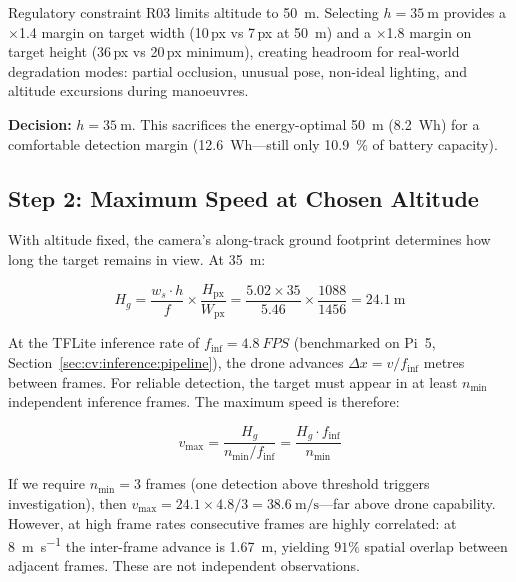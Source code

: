 Regulatory constraint R03 limits altitude to \SI{50}{\metre}.
Selecting $h = \SI{35}{\metre}$ provides a $\times$1.4 margin on target width (10\,px vs 7\,px at \SI{50}{\metre}) and a $\times$1.8 margin on target height (36\,px vs 20\,px minimum), creating headroom for real-world degradation modes: partial occlusion, unusual pose, non-ideal lighting, and altitude excursions during manoeuvres.

\textbf{Decision:} $h = \SI{35}{\metre}$.
This sacrifices the energy-optimal \SI{50}{\metre} (\SI{8.2}{Wh}) for a comfortable detection margin (\SI{12.6}{Wh}---still only \SI{10.9}{\percent} of battery capacity).

\subsection{Step 2: Maximum Speed at Chosen Altitude}\label{sec:step-max-speed}

With altitude fixed, the camera's along-track ground footprint determines how long the target remains in view.
At \SI{35}{\metre}:

\begin{equation}\label{eq:footprint-along}
  H_g = \frac{w_s \cdot h}{f} \times \frac{H_{\mathrm{px}}}{W_{\mathrm{px}}} = \frac{5.02 \times 35}{5.46} \times \frac{1088}{1456} = \SI{24.1}{\metre}
\end{equation}

At the TFLite inference rate of $f_{\mathrm{inf}} = \SI{4.8}{FPS}$ (benchmarked on Pi~5, Section~\ref{sec:cv:inference:pipeline}), the drone advances $\Delta x = v / f_{\mathrm{inf}}$ metres between frames.
For reliable detection, the target must appear in at least $n_{\min}$ independent inference frames.
The maximum speed is therefore:

\begin{equation}\label{eq:max-speed}
  v_{\max} = \frac{H_g}{n_{\min} / f_{\mathrm{inf}}} = \frac{H_g \cdot f_{\mathrm{inf}}}{n_{\min}}
\end{equation}

If we require $n_{\min} = 3$ frames (one detection above threshold triggers investigation), then $v_{\max} = 24.1 \times 4.8 / 3 = \SI{38.6}{\metre\per\second}$---far above drone capability.
However, at high frame rates consecutive frames are highly correlated: at \SI{8}{\metre\per\second} the inter-frame advance is \SI{1.67}{\metre}, yielding $91\%$ spatial overlap between adjacent frames.
These are not independent observations.


